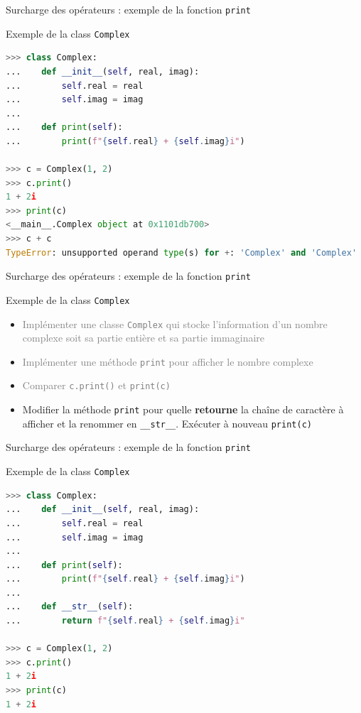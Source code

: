 \documentclass[10pt]{beamer}
\begin{document}
\begin{frame}[fragile]{Surcharge des opérateurs : exemple de la fonction \texttt{print}}
  \begin{block}{Exemple de la class \texttt{Complex}}
    \medskip
\begin{lstlisting}[language=python, numbers=none]
>>> class Complex:
...    def __init__(self, real, imag):
...        self.real = real
...        self.imag = imag
...
...    def print(self):
...        print(f"{self.real} + {self.imag}i")

>>> c = Complex(1, 2)
>>> c.print()
1 + 2i
>>> print(c)
<__main__.Complex object at 0x1101db700>
>>> c + c
TypeError: unsupported operand type(s) for +: 'Complex' and 'Complex'
\end{lstlisting}
\end{block}
\end{frame}


\begin{frame}[fragile]{Surcharge des opérateurs : exemple de la fonction \texttt{print}}

  \begin{block}{Exemple de la class \texttt{Complex}}
    \medskip
    \begin{itemize}
      \item \textcolor{gray}{Implémenter une classe \texttt{Complex} qui stocke l'information d'un nombre complexe soit sa partie entière et sa partie immaginaire}
      \item \textcolor{gray}{Implémenter une méthode \texttt{print} pour afficher le nombre complexe}
      \item \textcolor{gray}{Comparer \texttt{c.print()} et \texttt{print(c)}}
      \item Modifier la méthode \texttt{print} pour quelle \textbf{retourne} la chaîne de caractère à afficher et la renommer en \texttt{\_\_str\_\_}. Exécuter à nouveau \texttt{print(c)}
    \end{itemize}
  \end{block}
\end{frame}


\begin{frame}[fragile]{Surcharge des opérateurs : exemple de la fonction \texttt{print}}
  \begin{block}{Exemple de la class \texttt{Complex}}
    \medskip
\begin{lstlisting}[language=python, numbers=none]
>>> class Complex:
...    def __init__(self, real, imag):
...        self.real = real
...        self.imag = imag
...
...    def print(self):
...        print(f"{self.real} + {self.imag}i")
...
...    def __str__(self):
...        return f"{self.real} + {self.imag}i"

>>> c = Complex(1, 2)
>>> c.print()
1 + 2i
>>> print(c)
1 + 2i
\end{lstlisting}
\end{block}
\end{frame}
\end{document}
